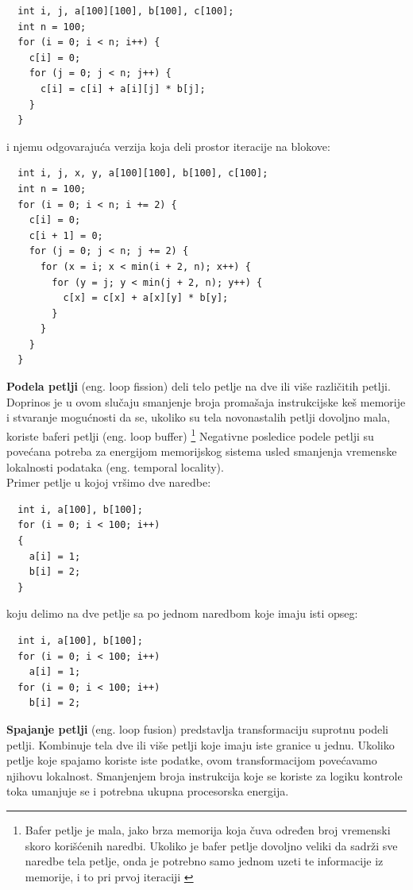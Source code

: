 \documentclass[a4paper]{article}
\begin{document}
\begin{lstlisting}
  int i, j, a[100][100], b[100], c[100];
  int n = 100;
  for (i = 0; i < n; i++) {
    c[i] = 0;
    for (j = 0; j < n; j++) {
      c[i] = c[i] + a[i][j] * b[j];
    }
  }
\end{lstlisting}
i njemu odgovarajuća verzija koja deli prostor iteracije na blokove:
\begin{lstlisting}
  int i, j, x, y, a[100][100], b[100], c[100];
  int n = 100;
  for (i = 0; i < n; i += 2) {
    c[i] = 0;
    c[i + 1] = 0;
    for (j = 0; j < n; j += 2) {
      for (x = i; x < min(i + 2, n); x++) {
        for (y = j; y < min(j + 2, n); y++) {
          c[x] = c[x] + a[x][y] * b[y];
        }
      }
    }
  }
\end{lstlisting}

\textbf{Podela petlji} (eng. loop fission) deli telo petlje na dve ili više različitih petlji. Doprinos je u ovom slučaju smanjenje broja promašaja instrukcijske keš memorije i stvaranje mogućnosti da se, ukoliko su tela novonastalih petlji dovoljno mala, koriste baferi petlji (eng. loop buffer) \footnote{Bafer petlje je mala, jako brza memorija koja čuva određen broj vremenski skoro korišćenih naredbi. Ukoliko je bafer petlje dovoljno veliki da sadrži sve naredbe tela petlje, onda je potrebno samo jednom uzeti te informacije iz memorije, i to pri prvoj iteraciji \cite{stallings2000computer}} Negativne posledice podele petlji su povećana potreba za energijom memorijskog sistema usled smanjenja vremenske lokalnosti podataka (eng. temporal locality).\\
Primer petlje u kojoj vršimo dve naredbe:
\begin{lstlisting}
  int i, a[100], b[100];
  for (i = 0; i < 100; i++)
  {
    a[i] = 1; 
    b[i] = 2;
  }
\end{lstlisting}
koju delimo na dve petlje sa po jednom naredbom koje imaju isti opseg:
\begin{lstlisting}
  int i, a[100], b[100];
  for (i = 0; i < 100; i++)
    a[i] = 1;                     
  for (i = 0; i < 100; i++)
    b[i] = 2;
\end{lstlisting}

\textbf{Spajanje petlji} (eng. loop fusion) predstavlja transformaciju suprotnu podeli petlji. Kombinuje tela dve ili više petlji koje imaju iste
granice u jednu. Ukoliko petlje koje spajamo koriste iste podatke, ovom transformacijom povećavamo
njihovu lokalnost. Smanjenjem broja instrukcija koje se koriste za logiku kontrole toka umanjuje se 
i potrebna ukupna procesorska energija.\\
\end{document}
